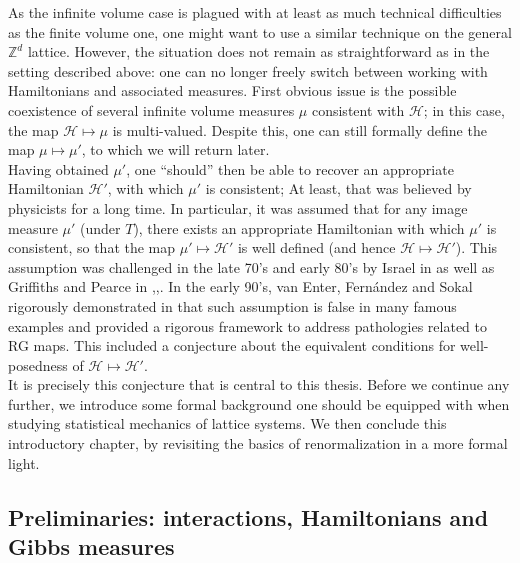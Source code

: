 \documentclass[12pt]{article}
\renewcommand{\H}{\mathcal{H}}
\newcommand{\Z}{\mathbb{Z}}
\newcommand{\1}{\mathbbm{1}}
\newcommand{\5}{\vspace{0.5cm}}
\theoremstyle{definition}
\begin{document}
As the infinite volume case is plagued with at least as much technical difficulties as the finite volume one, one might want to use a similar technique on the general $\Z^d$ lattice. However, the situation does not remain as straightforward as in the setting described above: one can no longer freely switch between working with Hamiltonians and associated measures. First obvious issue is the possible coexistence of several infinite volume measures $\mu$ consistent with $\H$; in this case, the map $\H\mapsto\mu$ is multi-valued. Despite this, one can still formally define the map $\mu\mapsto\mu'$, to which we will return later. \\

Having obtained $\mu'$, one ``should'' then be able to recover an appropriate Hamiltonian $\H'$, with which $\mu'$ is consistent; At least, that was believed by physicists for a long time. In particular, it was assumed that for any image measure $\mu'$ (under $T$), there exists an appropriate Hamiltonian with which $\mu'$ is consistent, so that the map $\mu'\mapsto\H'$ is well defined (and hence $\H\mapsto\H'$). This assumption was challenged in the late 70's and early 80's by Israel in \cite{Isr} as well as Griffiths and Pearce in \cite{GP1},\cite{GP2},\cite{Grif}. In the early 90's, van Enter, Fern\'andez and Sokal rigorously demonstrated in \cite{EFS} that such assumption is false in many famous examples and provided a rigorous framework to address pathologies related to RG maps. This included a conjecture about the equivalent conditions for well-posedness of $\H\mapsto\H'$. \\

It is precisely this conjecture that is central to this thesis. Before we continue any further, we introduce some formal background one should be equipped with when studying statistical mechanics of lattice systems. We then conclude this introductory chapter, by revisiting the basics of renormalization in a more formal light.


\subsection{Preliminaries: interactions, Hamiltonians and Gibbs measures}
\end{document}

